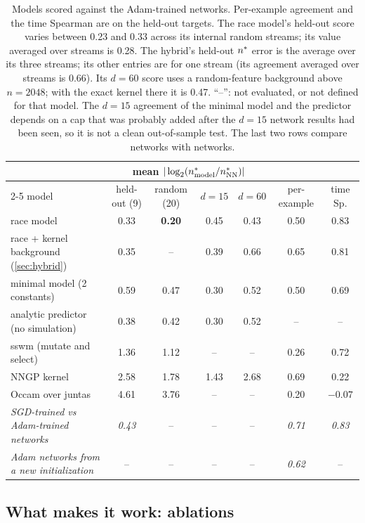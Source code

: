 \begin{table}[t]
\centering\footnotesize\setlength{\tabcolsep}{4pt}
\begin{tabular}{lcccccc}
\toprule
& \multicolumn{4}{c}{mean $|\log_2(n^{*}_{\rm model}/n^{*}_{\rm NN})|$} & & \\
\cmidrule(lr){2-5}
model & held-out (9) & random (20) & $d=15$ & $d=60$ & per-example & time Sp.\\
\midrule
race model & 0.33 & \textbf{0.20} & 0.45 & 0.43 & 0.50 & 0.83\\
race + kernel background (\cref{sec:hybrid}) & 0.35 & -- & 0.39 & 0.66 & 0.65 & 0.81\\
minimal model (2 constants) & 0.59 & 0.47 & 0.30 & 0.52 & 0.50 & 0.69\\
analytic predictor (no simulation) & 0.38 & 0.42 & 0.30 & 0.52 & -- & --\\
sswm (mutate and select) & 1.36 & 1.12 & -- & -- & 0.26 & 0.72\\
NNGP kernel & 2.58 & 1.78 & 1.43 & 2.68 & 0.69 & 0.22\\
Occam over juntas & 4.61 & 3.76 & -- & -- & 0.20 & $-0.07$\\
\midrule
\emph{SGD-trained vs Adam-trained networks} & \emph{0.43} & -- & -- & -- & \emph{0.71} & \emph{0.83}\\
\emph{Adam networks from a new initialization} & -- & -- & -- & -- & \emph{0.62} & --\\
\bottomrule
\end{tabular}
\caption{Models scored against the Adam-trained networks. Per-example agreement and the time Spearman are on the held-out targets. The race model's held-out score varies between 0.23 and 0.33 across its internal random streams; its value averaged over streams is 0.28. The hybrid's held-out $n^{*}$ error is the average over its three streams; its other entries are for one stream (its agreement averaged over streams is 0.66). Its $d=60$ score uses a random-feature background above $n=2048$; with the exact kernel there it is 0.47. ``--'': not evaluated, or not defined for that model. The $d=15$ agreement of the minimal model and the predictor depends on a cap that was probably added after the $d=15$ network results had been seen, so it is not a clean out-of-sample test. The last two rows compare networks with networks.}
\label{tab:scoreboard}
\end{table}

\subsection{What makes it work: ablations}\label{sec:ablations}

